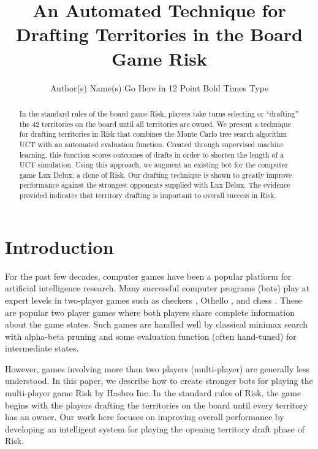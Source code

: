\documentclass[letterpaper]{article}
\title{An Automated Technique for Drafting Territories in the Board Game Risk%
}
\author{Author(s) Name(s) Go Here in 12 Point Bold Times Type}
\numberwithin{equation}{section}
\numberwithin{theorem}{section}
\numberwithin{lemma}{section}
\numberwithin{df}{section}
\begin{document}
\maketitle

\begin{abstract}
In the standard rules of the board game Risk, players take turns selecting or ``drafting'' the 42 territories on the board until all territories are owned.  We present a technique for drafting territories in Risk that combines the Monte Carlo tree search algorithm UCT with an automated evaluation function.  Created through supervised machine learning, this function scores outcomes of drafts in order to shorten the length of a UCT simulation.  Using this approach, we augment an existing bot for the computer game Lux Delux, a clone of Risk.  Our drafting technique is shown to greatly improve performance against the strongest opponents supplied with Lux Delux.  The evidence provided indicates that territory drafting is important to overall success in Risk.
\end{abstract}

\section{Introduction}


For the past few decades, computer games have been a popular platform for artificial intelligence research.  Many successful computer programs (bots) play at expert levels in two-player games such as checkers \cite{Chinook}, Othello \cite{Othello}, and
chess \cite{DeepBlue}.  These are popular two player games where both players share complete information about the game states.  Such games are handled well by classical minimax search with alpha-beta pruning and some evaluation function (often hand-tuned) for intermediate states.  

However, games involving more than two players (multi-player) are generally less understood.  In this paper, we describe how to create stronger bots for playing the multi-player game Risk by Hasbro Inc.  In the standard rules of Risk, the game begins with the players drafting the territories on the board until every territory has an owner.  Our work here focuses on improving overall performance by developing an intelligent system for playing the opening territory draft phase of Risk.
\end{document}
